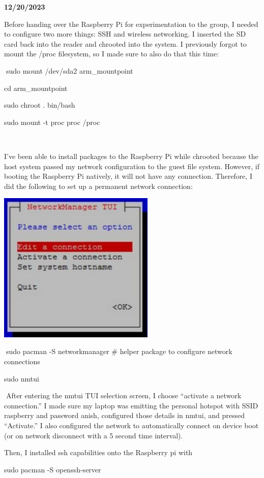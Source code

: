 \textbf{12/20/2023}

Before handing over the Raspberry Pi for experimentation to the group, I
needed to configure two more things: SSH and wireless networking. I
inserted the SD card back into the reader and chrooted into the system.
I previously forgot to mount the /proc filesystem, so I made sure to
also do that this time:

sudo mount /dev/sda2 arm\_mountpoint

cd arm\_mountpoint

sudo chroot . bin/bash

sudo mount -t proc proc /proc



I've been able to install packages to the Raspberry Pi while chrooted
because the host system passed my network configuration to the guest
file system. However, if booting the Raspberry Pi natively, it will not
have any connection. Therefore, I did the following to set up a
permanent network connection:

\includegraphics[width=2.93924in,height=2.84949in]{media/image22.png}

sudo pacman -S networkmanager \# helper package to configure network
connections

sudo nmtui

After entering the nmtui TUI selection screen, I choose ``activate a
network connection.'' I made sure my laptop was emitting the personal
hotspot with SSID raspberry and password anish, configured those details
in nmtui, and pressed ``Activate.'' I also configured the network to
automatically connect on device boot (or on network disconnect with a 5
second time interval).

Then, I installed ssh capabilities onto the Raspberry pi with

sudo pacman -S openssh-server

